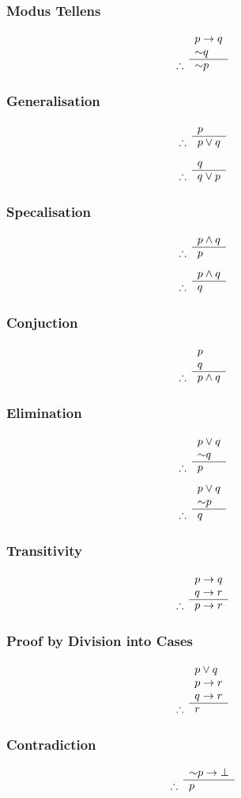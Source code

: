 \documentclass{report}
\begin{document}
\begin{multicols}{2}
	\subsubsection*{Modus Tellens}
	$$
		\argument{&p\lthen q & \\ &\lnot q & \\}{\lnot p &}
	$$
	
	\subsubsection*{Generalisation}
	$$
		\argument{&p & \\}{p\lor q &}
	$$
	$$
		\argument{&q & \\}{q\lor p &}
	$$
	
	\subsubsection*{Specalisation}
	$$
		\argument{&p\land q & \\}{p &}
	$$
	$$
		\argument{&p\land q & \\}{q &}
	$$

	\subsubsection*{Conjuction}
	$$
		\argument{&p & \\ &q & \\}{p\land q &}
	$$
	
	\subsubsection*{Elimination}
	$$
		\argument{&p\lor q & \\&\lnot q & \\}{p &}
	$$
	$$
		\argument{&p\lor q & \\&\lnot p & \\}{q &}
	$$

	\subsubsection*{Transitivity}
	$$
		\argument{&p\lthen q & \\&q\lthen r & \\}{p\lthen r &}
	$$

	\subsubsection*{Proof by Division into Cases}
	$$
		\argument{&p\lor q & \\&p\lthen r & \\&q\lthen r & \\}{r &}
	$$

	\subsubsection*{Contradiction}
	$$
		\argument{&\lnot p\lthen \bot & \\}{p &}
	$$
\end{multicols}
\end{document}

